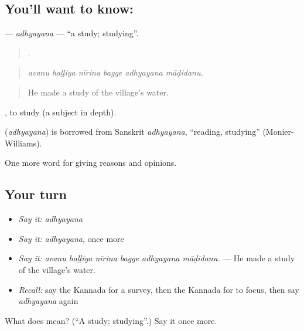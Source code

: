 \subsection*{You'll want to know: }
\textbf{} — \emph{adhyayana} — \textquotedblleft{}a study; studying\textquotedblright{}.

\begin{quote}
     .
\end{quote}

\begin{quote}
\emph{avanu haḷḷiya nīrina bagge adhyayana māḍidanu.}
\end{quote}

\begin{quote}
He made a study of the village's water.
\end{quote}

 , to study (a subject in depth).

\begin{cousinweb}
\textbf{} (\emph{adhyayana}) is borrowed from Sanskrit \emph{adhyayana}, \textquotedblleft{}reading, studying\textquotedblright{} (Monier-Williams).
\end{cousinweb}

\begin{grammarlens}[title={What you've built}]
One more word for giving reasons and opinions.
\end{grammarlens}

\subsection*{Your turn}
\begin{itemize}
\raggedright
  \item \emph{Say it:} \emph{adhyayana}
  \item \emph{Say it:} \emph{adhyayana}, once more
  \item \emph{Say it:} \emph{avanu haḷḷiya nīrina bagge adhyayana māḍidanu.} — He made a study of the village's water.
  \item \emph{Recall:} say the Kannada for a survey, then the Kannada for to focus, then say \emph{adhyayana} again
\end{itemize}

\begin{tcolorbox}[breakable,colback=teal!4,colframe=teal!35!black,title={Before you move on}]
What does  mean? (\textquotedblleft{}A study; studying\textquotedblright{}.) Say it once more.
\end{tcolorbox}
